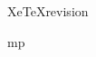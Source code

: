 
\begingroup


\ifx\Pattern\undefined
\def\Pattern{mp}   %
\fi


\expandafter\ifx\csname XeTeXrevision\endcsname\relax

  

\else

  \let\PATTERNS=\patterns
  \def\patterns{%
    \XeTeXinputencoding "bytes"
    
    \lccode`\'=`\'
    \PATTERNS
  }

  \Pattern

\fi

\endgroup


\endinput
